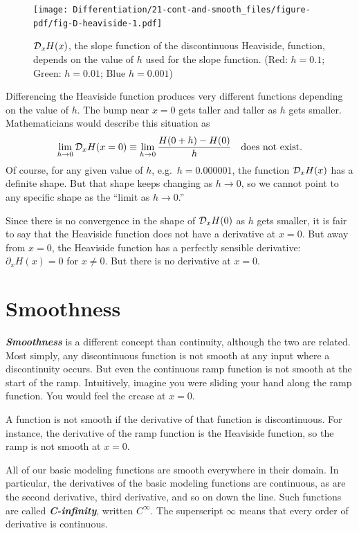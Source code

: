 \documentclass[
  letterpaper,
  DIV=11,
  numbers=noendperiod,
  oneside]{scrreprt}
\begin{document}
\begin{figure}[H]

{\centering \texttt{[image: Differentiation/21-cont-and-smooth\_files/figure-pdf/fig-D-heaviside-1.pdf]}

}

\caption{\label{fig-D-heaviside}\({\cal D}_x H(x)\), the slope function
of the discontinuous Heaviside, function, depends on the value of \(h\)
used for the slope function. (Red: \(h=0.1\); Green: \(h=0.01\); Blue
\(h=0.001\))}

\end{figure}

Differencing the Heaviside function produces very different functions
depending on the value of \(h\). The bump near \(x=0\) gets taller and
taller as \(h\) gets smaller. Mathematicians would describe this
situation as
\[\lim_{h\rightarrow0}{\cal D}_x H(x=0) \equiv \lim_{h\rightarrow 0} \frac{H(0+h) - H(0)}{h}\ \ \ \text{does not exist}.\]
Of course, for any given value of \(h\), e.g.~\(h=0.000001\), the
function \({\cal D}_x H(x)\) has a definite shape. But that shape keeps
changing as \(h \rightarrow 0\), so we cannot point to any specific
shape as the ``limit as \(h \rightarrow 0\).''

Since there is no convergence in the shape of \({\cal D}_x H(0)\) as
\(h\) gets smaller, it is fair to say that the Heaviside function does
not have a derivative at \(x=0\). But away from \(x=0\), the Heaviside
function has a perfectly sensible derivative: \(\partial_x H(x) = 0\)
for \(x\neq 0\). But there is no derivative at \(x=0\).

\hypertarget{smoothness}{%
\section{Smoothness}\label{smoothness}}

\textbf{\emph{Smoothness}} is a different concept than continuity,
although the two are related. Most simply, any discontinuous function is
not smooth at any input where a discontinuity occurs. But even the
continuous ramp function is not smooth at the start of the ramp.
Intuitively, imagine you were sliding your hand along the ramp function.
You would feel the crease at \(x=0\).

A function is not smooth if the derivative of that function is
discontinuous. For instance, the derivative of the ramp function is the
Heaviside function, so the ramp is not smooth at \(x=0\).

All of our basic modeling functions are smooth everywhere in their
domain. In particular, the derivatives of the basic modeling functions
are continuous, as are the second derivative, third derivative, and so
on down the line. Such functions are called \textbf{\emph{C-infinity}},
written \(C^\infty\). The superscript \(\infty\) means that every order
of derivative is continuous.
\end{document}
